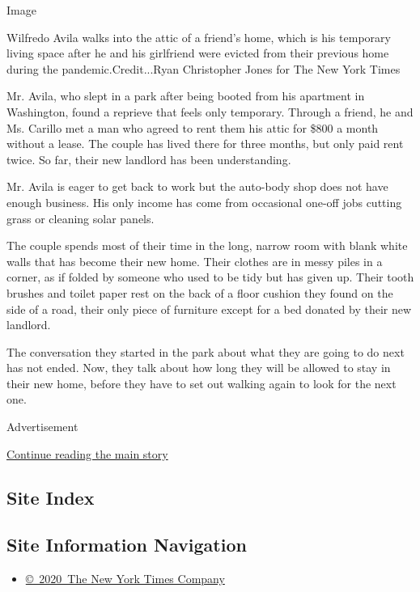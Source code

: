 Image

Wilfredo Avila walks into the attic of a friend's home, which is his
temporary living space after he and his girlfriend were evicted from
their previous home during the pandemic.Credit...Ryan Christopher Jones
for The New York Times

Mr. Avila, who slept in a park after being booted from his apartment in
Washington, found a reprieve that feels only temporary. Through a
friend, he and Ms. Carillo met a man who agreed to rent them his attic
for \$800 a month without a lease. The couple has lived there for three
months, but only paid rent twice. So far, their new landlord has been
understanding.

Mr. Avila is eager to get back to work but the auto-body shop does not
have enough business. His only income has come from occasional one-off
jobs cutting grass or cleaning solar panels.

The couple spends most of their time in the long, narrow room with blank
white walls that has become their new home. Their clothes are in messy
piles in a corner, as if folded by someone who used to be tidy but has
given up. Their tooth brushes and toilet paper rest on the back of a
floor cushion they found on the side of a road, their only piece of
furniture except for a bed donated by their new landlord.

The conversation they started in the park about what they are going to
do next has not ended. Now, they talk about how long they will be
allowed to stay in their new home, before they have to set out walking
again to look for the next one.

Advertisement

\protect\hyperlink{after-bottom}{Continue reading the main story}

\hypertarget{site-index}{%
\subsection{Site Index}\label{site-index}}

\hypertarget{site-information-navigation}{%
\subsection{Site Information
Navigation}\label{site-information-navigation}}

\begin{itemize}
\tightlist
\item
  \href{https://help.nytimes3xbfgragh.onion/hc/en-us/articles/115014792127-Copyright-notice}{©~2020~The
  New York Times Company}
\end{itemize}

